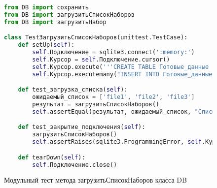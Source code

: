 \newpage
\begin{figure}[ht]
\begin{lstlisting}[language=Python]
from DB import сохранить
from DB import загрузитьСписокНаборов
from DB import загрузитьНабор

class TestЗагрузитьСписокНаборов(unittest.TestCase):
    def setUp(self):
        self.Подключение = sqlite3.connect(':memory:')
        self.Курсор = self.Подключение.cursor()
        self.Курсор.execute('''CREATE TABLE Готовые_данные (Адрес_файла TEXT)''')
        self.Курсор.executemany("INSERT INTO Готовые_данные (Адрес_файла) VALUES (?)", [('file1',), ('file2',), ('file3',)])

    def test_загрузка_списка(self):
        ожидаемый_список = ['file1', 'file2', 'file3']
        результат = загрузитьСписокНаборов()
        self.assertEqual(результат, ожидаемый_список, "Список наборов должен соответствовать ожидаемому")

    def test_закрытие_подключения(self):
        загрузитьСписокНаборов()
        self.assertRaises(sqlite3.ProgrammingError, self.Курсор.execute, "SELECT * FROM Готовые_данные")

    def tearDown(self):
        self.Подключение.close()
\end{lstlisting}  
\caption{Модульный тест метода загрузитьСписокНаборов класса DB}
\label{test5:image}
\end{figure}

